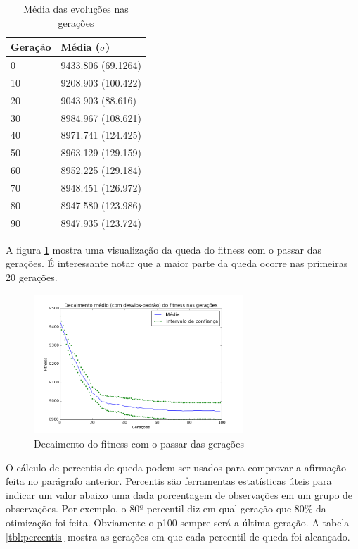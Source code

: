 \documentclass[11pt]{article}
\begin{document}
\begin{table}[H]
    \centering
    \caption{Média das evoluções nas gerações}
    \label{tbl:media}
    \begin{tabular}{|l|l|}
    \hline
    Geração & Média ($\sigma$) \\ \hline
    0  & 9433.806 (69.1264) \\ \hline
    10 & 9208.903 (100.422) \\ \hline
    20 & 9043.903 (88.616) \\ \hline
    30 & 8984.967 (108.621) \\ \hline
    40 & 8971.741 (124.425) \\ \hline
    50 & 8963.129 (129.159) \\ \hline
    60 & 8952.225 (129.184) \\ \hline
    70 & 8948.451 (126.972) \\ \hline
    80 & 8947.580 (123.986) \\ \hline
    90 & 8947.935 (123.724) \\ \hline
    \end{tabular}
\end{table}

A figura \ref{fig:decaimento} mostra uma visualização da queda do fitness com o
passar das gerações. É interessante notar que a maior parte da queda ocorre nas
primeiras 20 gerações.

\begin{figure}[H]
  \centering
  \includegraphics[width=0.7\textwidth]{decaimento.png}
  \caption{Decaimento do fitness com o passar das gerações}
  \label{fig:decaimento}
\end{figure}

O cálculo de percentis de queda podem ser usados para comprovar a afirmação
feita no parágrafo anterior. Percentis são ferramentas estatísticas úteis para
indicar um valor abaixo uma dada porcentagem de observações em um grupo de
observações. Por exemplo, o 80º percentil diz em qual geração que 80\% da
otimização foi feita. Obviamente o p100 sempre será a última geração. A tabela
\ref{tbl:percentis} mostra as gerações em que cada percentil de queda foi alcançado.
\end{document}
